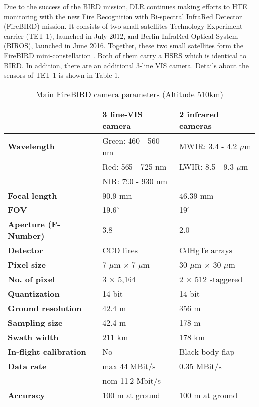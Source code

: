 \noindent Due to the success of the BIRD mission, DLR continues making efforts to HTE monitoring with the new Fire Recognition with Bi-spectral InfraRed Detector (FireBIRD) mission. It consists of two small satellites Technology Experiment carrier (TET-1), launched in July 2012, and Berlin InfraRed Optical System (BIROS), launched in June 2016. Together, these two small satellites form the FireBIRD mini-constellation \parencite{Reference10}. Both of them carry a HSRS which is identical to BIRD. In addition, there are an additional 3-line VIS camera. Details about the sensors of TET-1 is shown in Table 1.\\

\begin{table}[!ht]
\caption{Main FireBIRD camera parameters (Altitude 510km) \parencite{Reference11}}
\centering
\begin{tabular} {l|l|l}
 \hline\hline
   & \textbf{3 line-VIS camera} & \textbf{2 infrared cameras} \\
 \hline
 \textbf{Wavelength} & Green: 460 - 560 nm  & MWIR: 3.4 - 4.2 $\mu$m \\
  & Red: 565 - 725 nm & LWIR: 8.5 - 9.3 $\mu$m \\
  & NIR: 790 - 930 nm & \\ 
 \hline
 \textbf{Focal length} & 90.9 mm & 46.39 mm \\
 \hline
 \textbf{FOV} & 19.6$^\circ$ & 19$^\circ$ \\
 \hline
 \textbf{Aperture (F-Number)} & 3.8 & 2.0 \\
 \hline
 \textbf{Detector} & CCD lines & CdHgTe arrays \\
 \hline
 \textbf{Pixel size} & 7 $\mu$m $\times$ 7 $\mu$m & 30 $\mu$m $\times$ 30 $\mu$m \\
 \hline
 \textbf{No. of pixel} & 3 $\times$ 5,164 & 2 $\times$ 512 staggered \\
 \hline
 \textbf{Quantization} & 14 bit & 14 bit \\
 \hline
 \textbf{Ground resolution} & 42.4 m & 356 m \\
 \hline
 \textbf{Sampling size} & 42.4 m & 178 m \\
 \hline
 \textbf{Swath width} & 211 km & 178 km \\
 \hline
 \textbf{In-flight calibration} & No & Black body flap \\
 \hline
 \textbf{Data rate} & max 44 MBit/s & 0.35 MBit/s \\
  & nom 11.2 Mbit/s & \\
 \hline
 \textbf{Accuracy} & 100 m at ground & 100 m at ground \\
 \hline\hline
\end{tabular}
\label{ParaFireBIRD}
\end{table}

